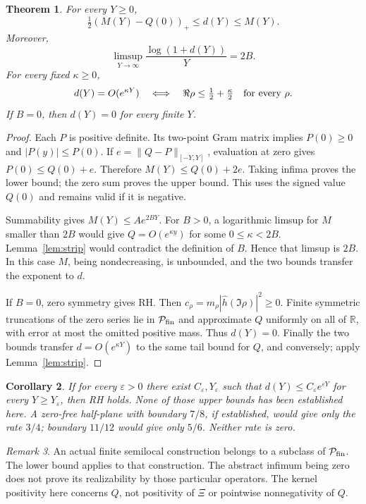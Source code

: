 \documentclass[11pt]{article}
\newtheorem{theorem}{Theorem}
\newtheorem{corollary}[theorem]{Corollary}
\theoremstyle{remark}\newtheorem{remark}[theorem]{Remark}
\newcommand{\R}{\mathbb R}
\begin{document}
\begin{theorem}\label{thm:distance}
For every $Y\ge0$,
\[
 \tfrac12(M(Y)-Q(0))_+\le d(Y)\le M(Y).
\]
Moreover,
\[
 \limsup_{Y\to\infty}\frac{\log(1+d(Y))}{Y}=2B.
\]
For every fixed $\kappa\ge0$,
\[
 d(Y)=O(e^{\kappa Y})
 \quad\Longleftrightarrow\quad
 \Re\rho\le\tfrac12+\tfrac\kappa2\quad\hbox{for every }\rho.
\]
If $B=0$, then $d(Y)=0$ for every finite $Y$.
\end{theorem}
\begin{proof}
Each $P$ is positive definite. Its two-point Gram matrix implies
$P(0)\ge0$ and $|P(y)|\le P(0)$. If $e=\|Q-P\|_{[-Y,Y]}$, evaluation
at zero gives $P(0)\le Q(0)+e$. Therefore $M(Y)\le Q(0)+2e$.
Taking infima proves the lower bound; the zero sum proves the upper bound.
This uses the signed value $Q(0)$ and remains valid if it is negative.

Summability gives $M(Y)\le A e^{2BY}$. For $B>0$, a logarithmic limsup
for $M$ smaller than $2B$ would give $Q=O(e^{\kappa y})$ for some
$0\le\kappa<2B$. Lemma~\ref{lem:strip} would contradict the definition
of $B$. Hence that limsup is $2B$. In this case $M$, being nondecreasing,
is unbounded, and the two bounds transfer the exponent to $d$.

If $B=0$, zero symmetry gives RH. Then $c_\rho=m_\rho
|\widehat h(\Im\rho)|^2\ge0$. Finite symmetric truncations of the zero
series lie in $\mathcal P_{\rm fin}$ and approximate $Q$ uniformly on
all of $\R$, with error at most the omitted positive mass. Thus $d(Y)=0$.
Finally the two bounds transfer $d=O(e^{\kappa Y})$ to the same tail
bound for $Q$, and conversely; apply Lemma~\ref{lem:strip}.
\end{proof}

\begin{corollary}
If for every $\varepsilon>0$ there exist $C_\varepsilon,Y_\varepsilon$
such that $d(Y)\le C_\varepsilon e^{\varepsilon Y}$ for every
$Y\ge Y_\varepsilon$, then RH holds. None of those upper bounds has
been established here. A zero-free half-plane with boundary $7/8$, if
established, would give only the rate $3/4$; boundary $11/12$ would give
only $5/6$. Neither rate is zero.
\end{corollary}

\begin{remark}
An actual finite semilocal construction belongs to a subclass of
$\mathcal P_{\rm fin}$. The lower bound applies to that construction.
The abstract infimum being zero does not prove its realizability by
those particular operators. The kernel positivity here concerns $Q$,
not positivity of $\Xi$ or pointwise nonnegativity of $Q$.
\end{remark}
\end{document}
